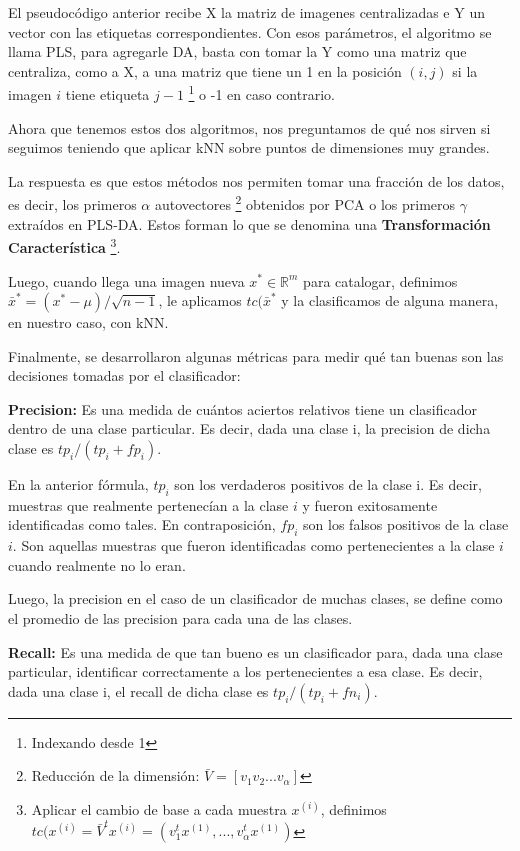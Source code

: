 El pseudoc\'odigo anterior recibe X la matriz de imagenes centralizadas e Y un vector con las etiquetas correspondientes. Con esos par\'ametros, el algoritmo se llama PLS, para agregarle DA, basta con tomar la Y como una matriz que centraliza, como a X, a una matriz que tiene un 1 en la posici\'on $(i, j)$ si la imagen $i$ tiene etiqueta $j-1$ \footnote{Indexando desde 1} o -1 en caso contrario.

Ahora que tenemos estos dos algoritmos, nos preguntamos de qu\'e nos sirven si seguimos teniendo que aplicar kNN sobre puntos de dimensiones muy grandes.

La respuesta es que estos m\'etodos nos permiten tomar una fracci\'on de los datos, es decir, los primeros $\alpha$ autovectores \footnote{Reducci\'on de la dimensi\'on: $\bar{V} = [v_{1} v_{2} ... v_{\alpha}]$} obtenidos por PCA o los primeros $\gamma$ extra\'idos en PLS-DA. Estos forman lo que se denomina una \textbf{Transformaci\'on Caracter\'istica} \footnote{Aplicar el cambio de base a cada muestra $x^{(i)}$, definimos $tc(x^{(i)} = \bar{V}^{t}x^{(i)} = (v_{1}^{t}x^{(1)}, ..., v_{\alpha}^{t}x^{(1)})$}.

Luego, cuando llega una imagen nueva $x^{*} \in \mathbb{R}^{m}$ para catalogar, definimos $\bar{x}^{*} = (x^{*} - \mu)/\sqrt{n-1}$, le aplicamos $tc(\bar{x}^{*}$ y la clasificamos de alguna manera, en nuestro caso, con kNN.

Finalmente, se desarrollaron algunas m\'etricas para medir qu\'e tan buenas son las decisiones tomadas por el clasificador:

\textbf{Precision:} Es una medida de cu\'antos aciertos relativos tiene un clasificador dentro de una clase particular. Es decir, dada una clase i, la precision de dicha clase es $tp_{i} / (tp_{i} + fp_{i})$.

En la anterior f\'ormula, $tp_{i}$ son los verdaderos positivos de la clase i. Es decir, muestras que realmente pertenec\'ian a la clase $i$ y fueron exitosamente identificadas como tales. En contraposici\'on, $fp_{i}$ son los falsos positivos de la clase $i$. Son aquellas muestras que fueron identificadas como pertenecientes a la clase $i$ cuando realmente no lo eran.

Luego, la precision en el caso de un clasificador de muchas clases, se define como el promedio de las precision para cada una de las clases.

\textbf{Recall:} Es una medida de que tan bueno es un clasificador para, dada una clase particular, identificar correctamente a los pertenecientes a esa clase. Es decir, dada una clase i, el recall de dicha clase es $tp_{i} / (tp_{i} + fn_{i})$.

